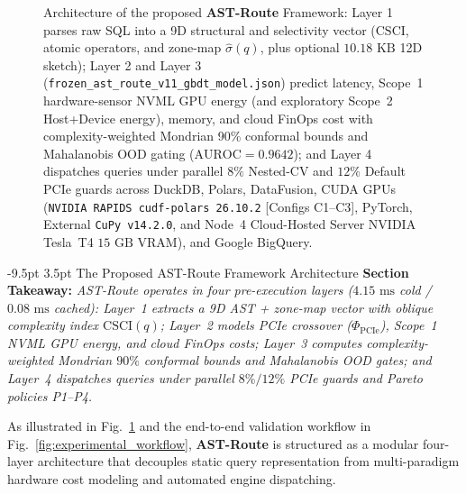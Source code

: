\documentclass[10pt,a4paper]{article}
\makeatletter
\renewcommand\section{\@startsection{section}{1}{\z@}%
  {-9.5pt \@plus -2pt \@minus -1.5pt}%
  {3.5pt \@plus 1pt}%
  {\normalfont\large\bfseries}}
\makeatother
\begin{document}
\begin{figure}[t!]
{%
}
\caption{Architecture of the proposed \textbf{AST-Route} Framework: Layer 1 parses raw SQL into a 9D structural and selectivity vector ($\text{CSCI}$, atomic operators, and zone-map $\hat{\sigma}(q)$, plus optional $10.18\text{ KB}$ 12D sketch); Layer 2 and Layer 3 (\texttt{frozen\_\allowbreak{}ast\_\allowbreak{}route\_\allowbreak{}v11\_\allowbreak{}gbdt\_\allowbreak{}model.json}) predict latency, Scope~1 hardware-sensor NVML GPU energy (and exploratory Scope~2 Host+Device energy), memory, and cloud FinOps cost with complexity-weighted Mondrian 90\% conformal bounds and Mahalanobis OOD gating ($\text{AUROC}=0.9642$); and Layer 4 dispatches queries under parallel $8\%$ Nested-CV and $12\%$ Default PCIe guards across DuckDB, Polars, DataFusion, CUDA GPUs (\texttt{NVIDIA RAPIDS cudf-polars 26.10.2} [Configs C1--C3], PyTorch, External \texttt{CuPy v14.2.0}, and Node~4 Cloud-Hosted Server NVIDIA Tesla~T4 $15\text{ GB}$ VRAM), and Google BigQuery.}
\label{fig:proposed_ast_framework}
\end{figure}

\section{The Proposed AST-Route Framework Architecture}
\noindent\textbf{Section Takeaway:} \emph{AST-Route operates in four pre-execution layers ($4.15\text{ ms}$ cold / $0.08\text{ ms}$ cached): Layer~1 extracts a 9D AST + zone-map vector with oblique complexity index $\text{CSCI}(q)$; Layer~2 models PCIe crossover ($\Phi_{\text{PCIe}}$), Scope~1 NVML GPU energy, and cloud FinOps costs; Layer~3 computes complexity-weighted Mondrian $90\%$ conformal bounds and Mahalanobis OOD gates; and Layer~4 dispatches queries under parallel $8\%/12\%$ PCIe guards and Pareto policies P1--P4.}\par\vspace{2pt}
As illustrated in Fig.~\ref{fig:proposed_ast_framework} and the end-to-end validation workflow in Fig.~\ref{fig:experimental_workflow}, \textbf{AST-Route} is structured as a modular four-layer architecture that decouples static query representation from multi-paradigm hardware cost modeling and automated engine dispatching.
\end{document}

